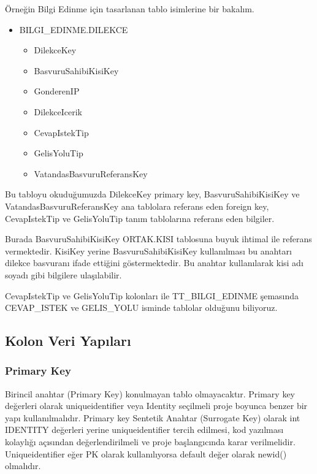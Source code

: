 \documentclass[10pt,a4paper,draft]{article}
\begin{document}
Örneğin Bilgi Edinme için tasarlanan tablo isimlerine bir bakalım.
\begin{itemize}

\item BILGI\_EDINME.DILEKCE
	\begin{itemize}
		\item DilekceKey
		\item BasvuruSahibiKisiKey
		\item GonderenIP
		\item DilekceIcerik
		\item CevapIstekTip
		\item GelisYoluTip
		\item VatandasBasvuruReferansKey
	\end{itemize}

\end{itemize}

Bu tabloyu okuduğumuzda DilekceKey primary key, 
BasvuruSahibiKisiKey ve VatandasBasvuruReferansKey ana tablolara referans eden foreign key,
CevapIstekTip ve GelisYoluTip tanım tablolarına referans eden bilgiler.

Burada BasvuruSahibiKisiKey ORTAK.KISI tablosuna buyuk ihtimal ile referans vermektedir.
KisiKey yerine BasvuruSahibiKisiKey kullanılması bu anahtarı dilekce basvuranı ifade ettiğini
göstermektedir. Bu anahtar kullanılarak kisi adı soyadı gibi bilgilere ulaşılabilir.

CevapIstekTip ve GelisYoluTip kolonları ile TT\_BILGI\_EDINME şemasında
CEVAP\_ISTEK ve GELIS\_YOLU isminde tablolar olduğunu biliyoruz.







\subsection{Kolon Veri Yapıları}
\subsubsection{Primary Key}
Birincil anahtar (Primary Key) konulmayan tablo olmayacaktır.
Primary key değerleri olarak uniqueidentifier veya Identity seçilmeli proje boyunca benzer bir yapı kullanılmalıdır.
Primary key Sentetik Anahtar (Surrogate Key) olarak int IDENTITY değerleri yerine uniqueidentifier tercih edilmesi,
kod yazılması kolaylığı açısından değerlendirilmeli ve proje başlangıcında karar verilmelidir.
Uniqueidentifier eğer PK olarak kullanılıyorsa default değer olarak newid() olmalıdır.
\end{document}
